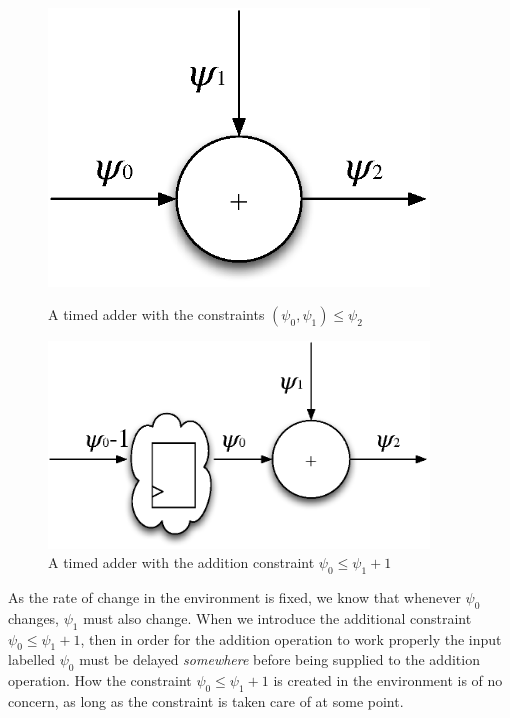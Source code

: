 \begin{figure}[ht]
\begin{minipage}[b]{0.375\linewidth}
\centering
\includegraphics[width=0.9\textwidth]{images/adder}
\caption{A timed adder with the constraints $(\psi_0,\psi_1) \le \psi_2$}
\label{fig:timedadder}
\end{minipage}
\hspace{0.5cm}
\begin{minipage}[b]{0.625\linewidth}
\centering
\includegraphics[width=0.9\textwidth]{images/addermemory}
\caption{A timed adder with the addition constraint $\psi_0 \le \psi_1 + 1$}
\label{fig:timedaddermemory}
\end{minipage}
\end{figure}

As the rate of change in the environment is fixed, we know that whenever $\psi_0$ changes, $\psi_1$ must also change.
When we introduce the additional constraint $\psi_0 \le \psi_1 + 1$, then in order for the addition operation to work properly the input labelled $\psi_0$ must be delayed \textit{somewhere} before being supplied to the addition operation.
How the constraint $\psi_0 \le \psi_1 + 1$ is created in the environment is of no concern, as long as the constraint is taken care of at some point.

